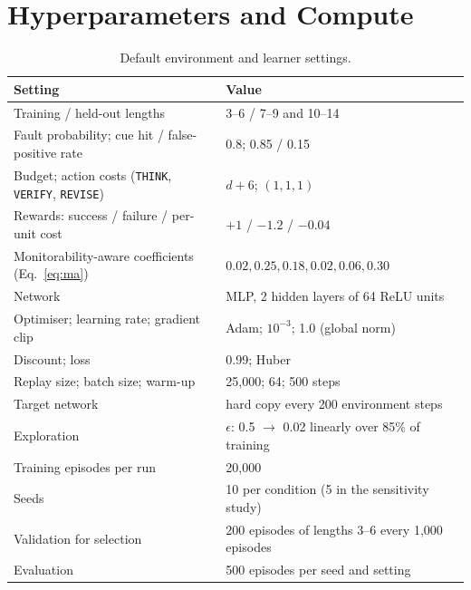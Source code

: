 \section{Hyperparameters and Compute}
\label{app:hparams}

\begin{table}[H]
\centering
\small
\setlength{\tabcolsep}{4pt}
\caption{Default environment and learner settings.}
\label{tab:hparams}
\begin{tabular}{ll}
\toprule
Setting & Value \\
\midrule
Training / held-out lengths & 3--6 / 7--9 and 10--14 \\
Fault probability; cue hit / false-positive rate & 0.8; 0.85 / 0.15 \\
Budget; action costs (\texttt{THINK}, \texttt{VERIFY}, \texttt{REVISE}) & $d + 6$; $(1,1,1)$ \\
Rewards: success / failure / per-unit cost & $+1$ / $-1.2$ / $-0.04$ \\
Monitorability-aware coefficients (Eq.~\ref{eq:ma}) & $0.02, 0.25, 0.18, 0.02, 0.06, 0.30$ \\
Network & MLP, 2 hidden layers of 64 ReLU units \\
Optimiser; learning rate; gradient clip & Adam; $10^{-3}$; 1.0 (global norm) \\
Discount; loss & 0.99; Huber \\
Replay size; batch size; warm-up & 25{,}000; 64; 500 steps \\
Target network & hard copy every 200 environment steps \\
Exploration & $\epsilon$: 0.5 $\to$ 0.02 linearly over 85\% of training \\
Training episodes per run & 20{,}000 \\
Seeds & 10 per condition (5 in the sensitivity study) \\
Validation for selection & 200 episodes of lengths 3--6 every 1{,}000 episodes \\
Evaluation & 500 episodes per seed and setting \\
\bottomrule
\end{tabular}
\end{table}

